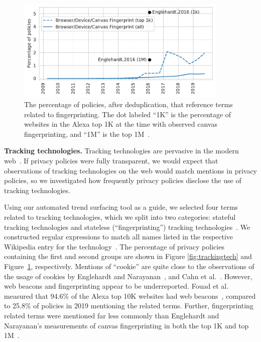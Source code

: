 \begin{figure}[t]
    \centering
    \includegraphics[width=0.9\textwidth]{chapters/privacypolicies/figures/fingerprinting.pdf}
    \caption[Fingerprinting trends]{The percentage of policies, after deduplication, that reference terms related to fingerprinting. The dot labeled ``1K'' is the percentage of websites in the Alexa top 1K at the time with observed canvas fingerprinting, and ``1M'' is the top 1M~\cite{englehardt2016online}.}
    \label{fig:fingerprinting}
\end{figure}

\textbf{Tracking technologies.} Tracking technologies are pervasive in the modern web~\cite{englehardt2016online}. If privacy policies were fully transparent, we would expect that observations of tracking technologies on the web would match mentions in privacy policies, so we investigated how frequently privacy policies disclose the use of tracking technologies. 

Using our automated trend surfacing tool as a guide, we selected four terms related to tracking technologies, which we split into two categories: stateful tracking technologies and stateless (``fingerprinting'') tracking technologies~\cite{mayer2012}. We constructed regular expressions to match all names listed in the respective Wikipedia entry for the technology~\cite{wikipediaCookie,wikipediaWebBeacon,wikipediaDeviceFingerprint,wikipediaCanvasFingerprint,wikipediaLSO,wikipediaEvercookie}.
The percentage of privacy policies containing the first and second
groups are shown in Figure \ref{fig:trackingtech} and Figure~\ref{fig:fingerprinting}, respectively. Mentions of ``cookie'' are quite close to the observations of the usage of cookies by Englehardt and Narayanan~\cite{englehardt2016online}, and Cahn et al.~\cite{cahn2016empirical}. However, web beacons and fingerprinting appear to be underreported. Fouad et al. measured that 94.6\% of the Alexa top 10K websites had web beacons~\cite{Fouad2020missed}, compared to 25.8\% of policies in 2019 mentioning the related terms. Further, fingerprinting related terms were mentioned far less commonly than Englehardt and Narayanan's measurements of canvas fingerprinting in both the top 1K and top 1M~\cite{englehardt2016online}.

